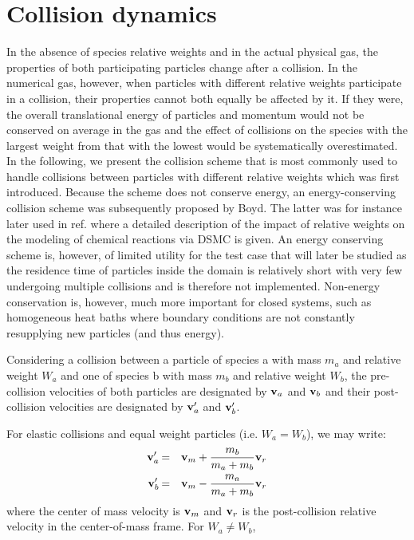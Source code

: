 \documentclass[12pt]{article}
\newcommand*{\myprime}{^{\prime}\mkern-1.2mu}
\newcommand{\bv}{{\bf v}}
\newcommand{\va}{\bv_a}
\newcommand{\vb}{\bv_b}
\newcommand{\vap}{\va\myprime}
\newcommand{\vbp}{\vb\myprime}
\begin{document}
\section{Collision dynamics}

In the absence of species relative weights and in the actual physical
gas, the properties of both participating particles change after a
collision. In the numerical gas, however, when particles with
different relative weights participate in a collision, their
properties cannot both equally be affected by it. If they were, the
overall translational energy of particles and momentum would not be
conserved on average in the gas and the effect of collisions on the
species with the largest weight from that with the lowest would be
systematically overestimated. In the following, we present the
collision scheme that is most commonly used to handle collisions
between particles with different relative weights which was first
introduced. Because the scheme does not conserve energy, an
energy-conserving collision scheme was subsequently proposed by
Boyd. The latter was for instance later used in ref. where a detailed
description of the impact of relative weights on the modeling of
chemical reactions via DSMC is given. An energy conserving scheme is,
however, of limited utility for the test case that will later be
studied as the residence time of particles inside the domain is
relatively short with very few undergoing multiple collisions and is
therefore not implemented.  Non-energy conservation is, however, much
more important for closed systems, such as homogeneous heat baths
where boundary conditions are not constantly resupplying new particles
(and thus energy).

Considering a collision between a particle of species a with mass
$m_a$ and relative weight $W_a$ and one of species b with mass $m_b$
and relative weight $W_b$, the pre-collision velocities of both
particles are designated by $\va$ and $\vb$ and their post-collision
velocities are designated by $\vap$ and $\vbp$. 

For elastic collisions and equal weight particles (i.e. $W_a=W_b$), we
may write:
\begin{eqnarray}
  \vap &=& \bv_m + \frac{m_b}{m_a+m_b}\bv_r \\
  \vbp &=& \bv_m - \frac{m_a}{m_a+m_b}\bv_r
\end{eqnarray}
where the center of mass velocity is $\bv_m$ and $\bv_r$ is the
post-collision relative velocity in the center-of-mass frame.  For
$W_a\not=W_b$, 
\end{document}

